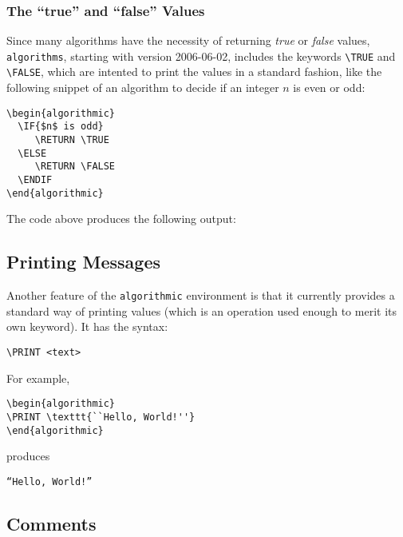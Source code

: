 \documentclass[letterpaper]{article}
\newcommand{\keyword}[1]{\texttt{#1}}
\begin{document}
\subsubsection{The ``true'' and ``false'' Values}

Since many algorithms have the necessity of returning \emph{true} or
\emph{false} values, \keyword{algorithms}, starting with version
2006-06-02, includes the keywords \verb+\TRUE+ and \verb+\FALSE+,
which are intented to print the values in a standard fashion, like the
following snippet of an algorithm to decide if an integer $n$ is even or
odd:
\begin{verbatim}
\begin{algorithmic}
  \IF{$n$ is odd}
     \RETURN \TRUE
  \ELSE
     \RETURN \FALSE
  \ENDIF
\end{algorithmic}
\end{verbatim}
The code above produces the following output:
\begin{algorithmic}
     \RETURN \TRUE
  \ELSE
     \RETURN \FALSE
  \ENDIF
\end{algorithmic}

\subsection{Printing Messages}

Another feature of the \keyword{algorithmic} environment is that it
currently provides a standard way of printing values (which is an
operation used enough to merit its own keyword). It has the syntax:
\begin{verbatim}
\PRINT <text>
\end{verbatim}
For example,
\begin{verbatim}
\begin{algorithmic}
\PRINT \texttt{``Hello, World!''}
\end{algorithmic}
\end{verbatim}
produces
\begin{algorithmic}
  \PRINT \texttt{``Hello, World!''}
\end{algorithmic}

\subsection{Comments}
\end{document}
